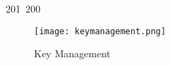 201~200~\documentclass{article}
\begin{document}
	                                                                                                                                                                                                                                                                                                	                                                                                                                                        	    	                                                                                                	                                                                                                                                                                                                                                \begin{figure}[ht]
	                                                                                                                                                                                                                                                                                                	                                                                                                                                        	    	                                                                                                	                                                                                                                                                                                                                                    \centering
	                                                                                                                                                                                                                                                                                                	                                                                                                                                        	    	                                                                                                	                                                                                                                                                                                                                                        \texttt{[image: keymanagement.png]}
	                                                                                                                                                                                                                                                                                                	                                                                                                                                        	    	                                                                                                	                                                                                                                                                                                                                                            \caption{Key Management}

\end{figure}
\end{document}
